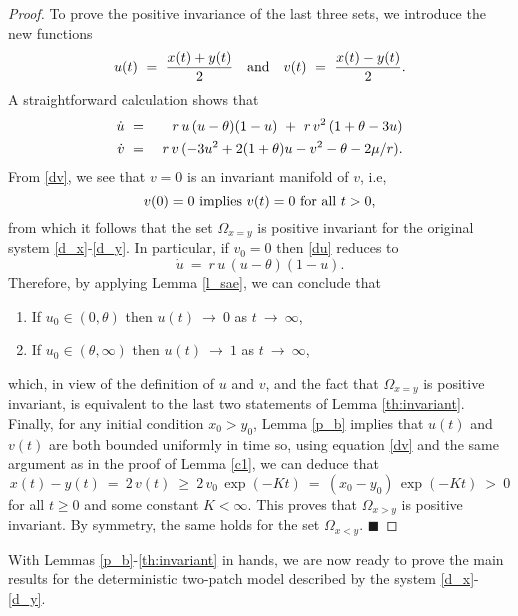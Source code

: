 \begin{proof}
 To prove the positive invariance of the last three sets, we introduce the new functions
 $$ u (t) \ = \ \frac{x (t) + y (t)}{2} \quad \hbox{and} \quad v (t) \ = \ \frac{x (t) - y (t)}{2}. $$
 A straightforward calculation shows that
\begin{eqnarray}
\label{du}
 \dot{u} \ & = & \ r \,u \,(u - \theta) (1 - u) \ + \ r \,v^2 \,(1 + \theta - 3u) \vspace{4pt} \\
\label{dv}
 \dot{v} \ & = & \ r \,v \,(- 3 u^2 + 2 (1 + \theta) u - v^2 - \theta - 2 \mu / r).
\end{eqnarray}
 From \eqref{dv}, we see that $v = 0$ is an invariant manifold of $v$, i.e,
 $$ v (0) = 0 \ \hbox{implies} \ v (t) = 0 \ \hbox{for all} \  t > 0, $$
 from which it follows that the set $\Omega_{x = y}$ is positive invariant for the original system \eqref{d_x}-\eqref{d_y}.
 In particular, if $v_0 = 0$ then \eqref{du} reduces to
 $$ \dot{u} \ = \ r \,u \,(u - \theta) (1 - u). $$
 Therefore, by applying Lemma \ref{l_sae}, we can conclude that
\begin{enumerate}
 \item If $u_0 \in (0, \theta)$ then $u (t) \ {{\rightarrow}} \ 0$ as $t \ {{\rightarrow}} \ \infty$, \vspace{4pt}
 \item If $u_0 \in (\theta, \infty)$ then $u (t) \ {{\rightarrow}} \ 1$ as $t \ {{\rightarrow}} \ \infty$,
\end{enumerate}
 which, in view of the definition of $u$ and $v$, and the fact that $\Omega_{x = y}$ is positive
 invariant, is equivalent to the last two statements of Lemma \ref{th:invariant}.
 Finally, for any initial condition $x_0 > y_0$, Lemma \ref{p_b} implies that $u (t)$ and $v (t)$ are both bounded uniformly
 in time so, using equation \eqref{dv} and the same argument as in the proof of Lemma \ref{c1}, we can deduce that
 $$ x (t) - y (t) \ = \ 2 \,v (t) \ \geq \ 2 \,v_0 \,\exp (- K t) \ = \ (x_0 - y_0) \,\exp (- K t) \ > \ 0 $$
 for all $t \geq 0$ and some constant $K < \infty$.
 This proves that $\Omega_{x > y}$ is positive invariant.
 By symmetry, the same holds for the set $\Omega_{x < y}$. \hspace{2mm} $\blacksquare$
\end{proof}

\noindent With Lemmas \ref{p_b}-\ref{th:invariant} in hands, we are now ready to prove the main results for the deterministic
 two-patch model described by the system \eqref{d_x}-\eqref{d_y}.

